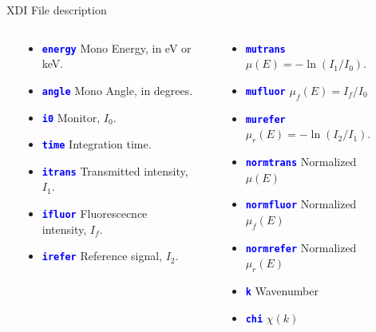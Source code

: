 \documentclass[final]{beamer}
\newcommand{\Color}[2]{{\textcolor{#1}{#2}}}
\newcommand{\Blue}[1]{{\Color{Blue}{\bf{#1}}}}
\begin{document}
\begin{frame}{}
\begin{columns}[t]
\begin{column}{.42\linewidth}
\begin{block}{\large XDI File description}
         \begin{columns}[T]
           \begin{column}{0.06\linewidth}
           \end{column}
           \begin{column}{0.41\linewidth}
             \begin{itemize}
             \item {\Blue{\tt{energy}}}  Mono Energy, in eV or keV.
             \item {\Blue{\tt{angle}}}   Mono Angle, in degrees.
             \item {\Blue{\tt{i0}}}      Monitor, $I_0$.
             \item {\Blue{\tt{time}}}    Integration time.
             \item {\Blue{\tt{itrans}}}  Transmitted intensity, $I_1$.
             \item {\Blue{\tt{ifluor}}}  Fluorescecnce intensity, $I_f$.
             \item {\Blue{\tt{irefer}}}  Reference signal, $I_2$.
             \end{itemize}
           \end{column}
           \begin{column}{0.06\linewidth}
           \end{column}
           \begin{column}{0.41\linewidth}
               \begin{itemize}
               \item {\Blue{\tt{mutrans}}}   $\mu(E) = -\ln(I_1/I_0)$.
               \item {\Blue{\tt{mufluor}}}   $\mu_f(E) = I_f/I_0$
               \item {\Blue{\tt{murefer}}}   $\mu_r(E) = -\ln(I_2/I_1)$.
               \item {\Blue{\tt{normtrans}}} Normalized $\mu(E)$
               \item {\Blue{\tt{normfluor}}} Normalized $\mu_f(E)$
               \item {\Blue{\tt{normrefer}}} Normalized $\mu_r(E)$
               \item {\Blue{\tt{k}}}         Wavenumber
               \item {\Blue{\tt{chi}}}       $\chi(k)$
               \end{itemize}
           \end{column}
           \begin{column}{0.06\linewidth}
           \end{column}
         \end{columns}


\end{block}
\end{column}
\end{columns}
\end{frame}
\end{document}
